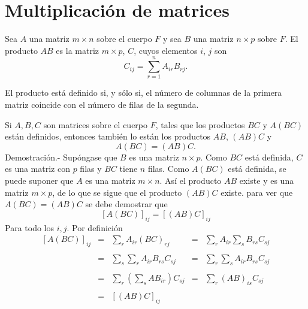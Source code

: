 \begin{comment}
	\end{array}$$

	Por la forma reducida tenemos $Rango(A)=Rango(A/y)$, así el sistema tiene una única solución $y\in \mathbb{R}^3.$\\\\

    \item 

\end{enumerate}

\end{comment}


\section{Multiplicación de matrices}

\begin{tcolorbox}
    \begin{def.}
	Sea $A$ una matriz $m\times n$ sobre el cuerpo $F$ y sea $B$ una matriz $n\times p$ sobre $F$. El producto $AB$ es la matriz $m\times p$, $C$, cuyos elementos $i$, $j$ son
	$$C_{ij} = \sum_{r=1}^n A_{ir}B_{rj}.$$
    \end{def.}
\end{tcolorbox}

El producto está definido si, y sólo si, el número de columnas de la primera matriz coincide con el número de filas de la segunda.\\

\begin{teo}
    Si $A,B, C$ son matrices sobre el cuerpo $F$, tales que los productos $BC$ y $A(BC)$ están definidos, entonces también lo están los productos $AB$, $(AB)C$ y 
    $$A(BC)=(AB)C.$$
	Demostración.-\; Supóngase que $B$ es una matriz $n\times p$. Como $BC$ está definida, $C$ es una matriz con $p$ filas y $BC$ tiene $n$ filas. Como $A(BC)$ está definida, se puede suponer que $A$ es una matriz $m\times n$. Así el producto $AB$ existe y es una matriz $m\times p$, de lo que se sigue que el producto $(AB)C$ existe. para ver que $A(BC)=(AB)C$ se debe demostrar que
	$$\left[A(BC)\right]_{ij}=\left[(AB)C\right]_{ij}$$
	Para todo los $i,j$. Por definición
	$$\begin{array}{rclcl}
	    \left[A(BC)\right]_{ij} &=& \displaystyle\sum_{r} A_{ir}(BC)_{rj} &=& \displaystyle\sum_{r} A_{ir}\sum_{s} B_{rs}C_{sj}\\\\
				    &=& \displaystyle\sum_{s}\sum_{r} A_{ir}B_{rs}C_{sj} &=& \displaystyle\sum_{r}\sum_{s} A_{ir}B_{rs}C_{sj}\\\\
				    &=& \displaystyle\sum_{r}\left(\sum_{s} AB_{ir}\right)C_{sj} &=& \displaystyle\sum_{r} (AB)_{is}C_{sj}\\\\
				    &=& \left[(AB)C\right]_{ij} &&\\\\
	\end{array}$$
\end{teo}

